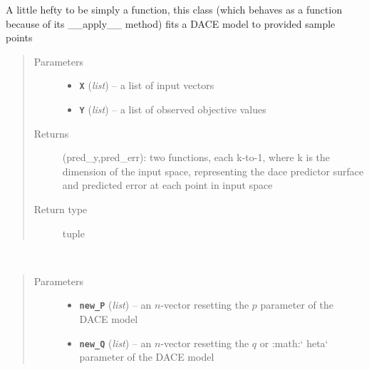 \documentclass[letterpaper,10pt,english]{sphinxmanual}
\begin{document}
\label{index:module-smbo.models}\label{index:module-models}

\begin{fulllineitems}
\label{index:smbo.models.dace}
A little hefty to be simply a function, this class (which behaves as a function because of its \_\_apply\_\_ method)
fits a DACE model to provided sample points
\begin{quote}\begin{description}
\item[{Parameters}] \leavevmode\begin{itemize}
\item {} 
\textbf{\texttt{X}} (\emph{list}) -- a list of input vectors

\item {} 
\textbf{\texttt{Y}} (\emph{list}) -- a list of observed objective values

\end{itemize}

\item[{Returns}] \leavevmode
(pred\_y,pred\_err): two functions, each k-to-1, where k is the dimension of the input space, representing the dace predictor surface and predicted error at each point in input space

\item[{Return type}] \leavevmode
tuple

\end{description}\end{quote}

\begin{fulllineitems}
\label{index:smbo.models.dace.conc_likelihood}~\begin{quote}\begin{description}
\item[{Parameters}] \leavevmode\begin{itemize}
\item {} 
\textbf{\texttt{new\_P}} (\emph{list}) -- an \(n\)-vector resetting the \(p\) parameter of the DACE model

\item {} 
\textbf{\texttt{new\_Q}} (\emph{list}) -- an \(n\)-vector resetting the \(q\) or :math:{}`        heta{}` parameter of the DACE model


\end{itemize}
\end{description}
\end{quote}
\end{fulllineitems}
\end{fulllineitems}
\end{document}
